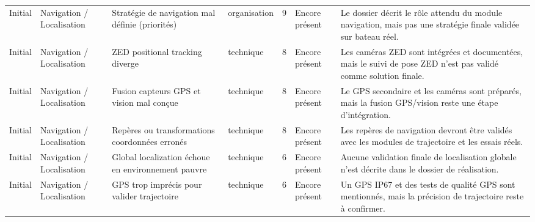 \documentclass[11pt,letterpaper]{article}
\begin{document}
\begin{longtable}{@{}L{1.55cm}L{2.05cm}L{3.25cm}L{1.95cm}L{1.05cm}L{2.15cm}L{3.55cm}@{}}
    Initial & Navigation / Localisation & Stratégie de navigation mal définie (priorités) & organisation & 9 & Encore présent & Le dossier décrit le rôle attendu du module navigation, mais pas une stratégie finale validée sur bateau réel. \\
    Initial & Navigation / Localisation & ZED positional tracking diverge & technique & 8 & Encore présent & Les caméras ZED sont intégrées et documentées, mais le suivi de pose ZED n'est pas validé comme solution finale. \\
    Initial & Navigation / Localisation & Fusion capteurs GPS et vision mal conçue & technique & 8 & Encore présent & Le GPS secondaire et les caméras sont préparés, mais la fusion GPS/vision reste une étape d'intégration. \\
    Initial & Navigation / Localisation & Repères ou transformations coordonnées erronés & technique & 8 & Encore présent & Les repères de navigation devront être validés avec les modules de trajectoire et les essais réels. \\
    Initial & Navigation / Localisation & Global localization échoue en environnement pauvre & technique & 6 & Encore présent & Aucune validation finale de localisation globale n'est décrite dans le dossier de réalisation. \\
    Initial & Navigation / Localisation & GPS trop imprécis pour valider trajectoire & technique & 6 & Encore présent & Un GPS IP67 et des tests de qualité GPS sont mentionnés, mais la précision de trajectoire reste à confirmer. \\


\end{longtable}
\end{document}

